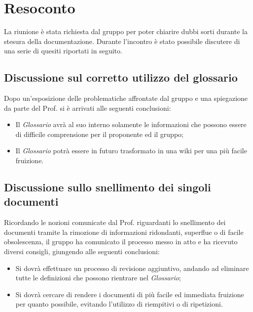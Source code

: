 \newpage


\section{Resoconto}
La riunione è stata richiesta dal gruppo \textit{\Gruppo{}} per poter chiarire dubbi sorti durante la stesura della documentazione.
Durante l'incontro è stato possibile discutere di una serie di quesiti riportati in seguito.
\subsection{Discussione sul corretto utilizzo del glossario}
Dopo un'esposizione delle problematiche affrontate dal gruppo e una spiegazione da parte del Prof. \textit{\Tullio{}} si è arrivati alle seguenti conclusioni:
\begin{itemize}
	\item Il \textit{Glossario} avrà al suo interno solamente le informazioni che possono essere di difficile comprensione per il proponente ed il gruppo;
	\item Il \textit{Glossario} potrà essere in futuro trasformato in una wiki per una più facile fruizione.
\end{itemize}
\subsection{Discussione sullo snellimento dei singoli documenti}
Ricordando le nozioni comunicate dal Prof. \textit{\Tullio{}} riguardanti lo snellimento dei documenti tramite la rimozione di informazioni ridondanti, superflue o di facile obsolescenza, il gruppo ha comunicato il processo messo in atto e ha ricevuto diversi consigli, giungendo alle seguenti conclusioni:
\begin{itemize}
	\item Si dovrà effettuare un processo di revisione aggiuntivo, andando ad eliminare tutte le definizioni che possono rientrare nel \textit{Glossario};
	\item Si dovrà cercare di rendere i documenti di più facile ed immediata fruizione per quanto possibile, evitando l'utilizzo di riempitivi o di ripetizioni.
\end{itemize}
